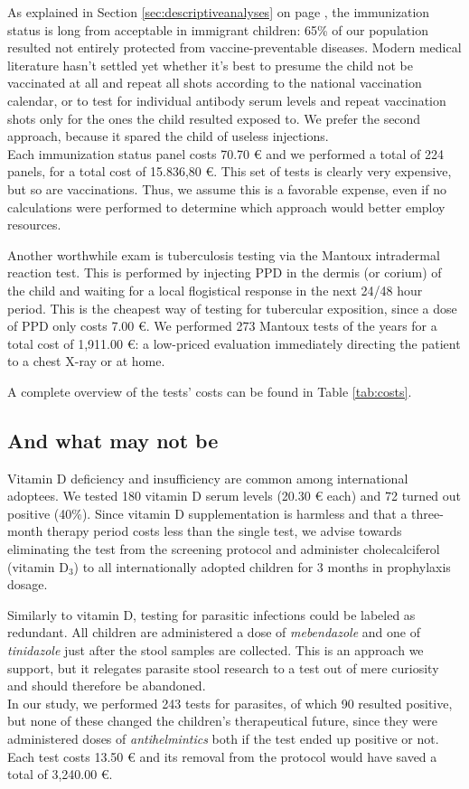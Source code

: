 As explained in Section \ref{sec:descriptiveanalyses} on page \pageref{sec:descriptiveanalyses}, the immunization status is long from acceptable in immigrant children: 65\% of our population resulted not entirely protected from vaccine-preventable diseases. Modern medical literature hasn't settled yet whether it's best to presume the child not be vaccinated at all and repeat all shots according to the national vaccination calendar, or to test for individual antibody serum levels and repeat vaccination shots only for the ones the child resulted exposed to. We prefer the second approach, because it spared the child of useless injections.\\
Each immunization status panel costs 70.70 € and we performed a total of 224 panels, for a total cost of 15.836,80 €. This set of tests  is clearly very expensive, but so are vaccinations. Thus, we assume this is a favorable expense, even if no calculations were performed to determine which approach would better employ resources.

Another worthwhile exam is tuberculosis testing via the Mantoux intradermal reaction test. This is performed by injecting PPD in the dermis (or corium) of the child and waiting for a local flogistical response in the next 24/48 hour period. This is the cheapest way of testing for tubercular exposition, since a dose of PPD only costs 7.00 €. We performed 273 Mantoux tests of the years for a total cost of 1,911.00 €: a low-priced evaluation immediately directing the patient to a chest X-ray or at home.

A complete overview of the tests' costs can be found in Table \ref{tab:costs}.

\subsection{And what may not be}\label{sub:notworthwhile}
Vitamin D deficiency and insufficiency are common among international adoptees. We tested 180 vitamin D serum levels (20.30 € each) and 72 turned out positive (40\%). Since vitamin D supplementation is harmless and that a three-month therapy period costs less than the single test, we advise towards eliminating the test from the screening protocol and administer cholecalciferol (vitamin D$_3$) to all internationally adopted children for 3 months in prophylaxis dosage.

Similarly to vitamin D, testing for parasitic infections could be labeled as redundant. All children are administered a dose of \textit{mebendazole} and one of \textit{tinidazole} just after the stool samples are collected. This is an approach we support, but it relegates parasite stool research to a test out of mere curiosity and should therefore be abandoned.\\
In our study, we performed 243 tests for parasites, of which 90 resulted positive, but none of these changed the children's therapeutical future, since they were administered doses of \textit{antihelmintics} both if the test ended up positive or not. Each test costs 13.50 € and its removal from the protocol would have saved a total of 3,240.00 €.

